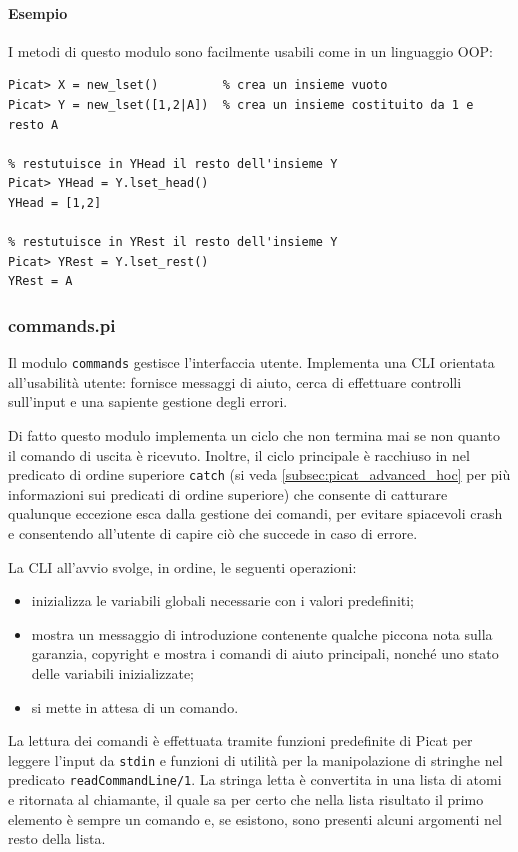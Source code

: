 \documentclass[12pt,a4paper,openright]{book} %
\begin{document}
\paragraph{Esempio}

I metodi di questo modulo sono facilmente usabili come in un linguaggio OOP:
\begin{verbatim}
Picat> X = new_lset()         % crea un insieme vuoto
Picat> Y = new_lset([1,2|A])  % crea un insieme costituito da 1 e resto A

% restutuisce in YHead il resto dell'insieme Y
Picat> YHead = Y.lset_head()
YHead = [1,2]

% restutuisce in YRest il resto dell'insieme Y
Picat> YRest = Y.lset_rest()
YRest = A
\end{verbatim}


\subsubsection{commands.pi}

Il modulo \texttt{commands} gestisce l'interfaccia utente. Implementa
una CLI orientata all'usabilità utente: fornisce messaggi di aiuto,
cerca di effettuare controlli sull'input e una sapiente gestione degli
errori.

Di fatto questo modulo implementa un ciclo che non termina mai se non
quanto il comando di uscita è ricevuto. Inoltre, il ciclo principale è
racchiuso in nel predicato di ordine superiore \texttt{catch} (si veda
\ref{subsec:picat_advanced_hoc} per più informazioni sui predicati di
ordine superiore) che consente di catturare qualunque eccezione esca
dalla gestione dei comandi, per evitare spiacevoli crash e consentendo
all'utente di capire ciò che succede in caso di errore.

La CLI all'avvio svolge, in ordine, le seguenti operazioni:
\begin{itemize}
	\item inizializza le variabili globali necessarie con i valori
          predefiniti;
	\item mostra un messaggio di introduzione contenente qualche
          piccona nota sulla garanzia, copyright e mostra i comandi di
          aiuto principali, nonché uno stato delle variabili
          inizializzate;
	\item si mette in attesa di un comando.
\end{itemize}

La lettura dei comandi è effettuata tramite funzioni predefinite di
Picat per leggere l'input da \texttt{stdin} e funzioni di utilità per
la manipolazione di stringhe nel predicato
\texttt{readCommandLine/1}. La stringa letta è convertita in una lista
di atomi e ritornata al chiamante, il quale sa per certo che nella
lista risultato il primo elemento è sempre un comando e, se esistono,
sono presenti alcuni argomenti nel resto della lista.
\end{document}
